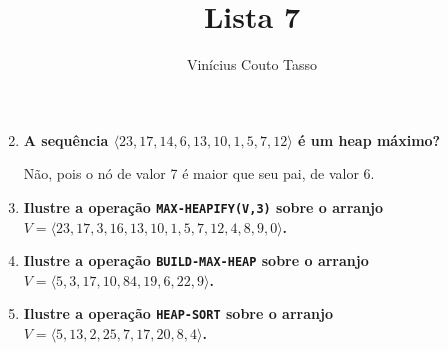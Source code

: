 \documentclass{article}
\title{Lista 7}
\author{Vinícius Couto Tasso}
\date{}
\begin{document}
\maketitle
{}
         
\begin{enumerate}

\setcounter{enumi}{1}

\item \textbf{A sequência $\langle 23, 17, 14, 6, 13, 10, 1, 5, 7, 12 \rangle$ é um heap máximo?}

Não, pois o nó de valor 7 é maior que seu pai, de valor 6.

\item \textbf{Ilustre a operação \texttt{MAX-HEAPIFY(V,3)} sobre o arranjo $V = \langle 23, 17, 3, 16, 13, 10, 1, 5, 7, 12, 4, 8, 9, 0 \rangle$.}



\newpage

\item \textbf{Ilustre a operação \texttt{BUILD-MAX-HEAP} sobre o arranjo $V = \langle 5, 3, 17, 10, 84, 19, 6, 22, 9 \rangle$.}



\item \textbf{Ilustre a operação \texttt{HEAP-SORT} sobre o arranjo $V = \langle 5, 13, 2, 25, 7, 17, 20, 8, 4 \rangle$.}



\end{enumerate}
\end{document}
